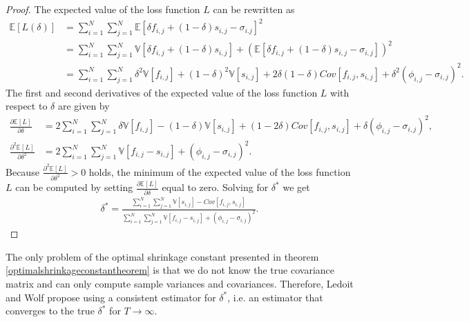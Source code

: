     	\begin{proof}
    	        The expected value of the loss function $L$ can be rewritten as
    	        \begin{align*}
    	            \mathbb{E}[L(\delta)] &= \sum_{i=1}^N \sum_{j=1}^N \mathbb{E}[\delta f_{i,j} + (1- \delta) s_{i,j} - \sigma_{i.j}]^2 \\
    	            &= \sum_{i=1}^N \sum_{j=1}^N \mathbb{V}[\delta f_{i,j} + (1 - \delta) s_{i,j}] + (\mathbb{E}[\delta f_{i,j} + (1- \delta) s_{i,j} - \sigma_{i,j}])^2 \\
    	            &= \sum_{i=1}^N \sum_{j=1}^N \delta^2 \mathbb{V}[f_{i,j}] + (1 - \delta)^2 \mathbb{V}[s_{i,j}] + 2 \delta (1 - \delta) Cov[f_{i,j}, s_{i,j}] + \delta^2 (\phi_{i,j} - \sigma_{i,j})^2.
    	        \end{align*}
    	        The first and second derivatives of the expected value of the loss function $L$ with respect to $\delta$ are given by
    	        \begin{align*}
    	            \frac{\partial \mathbb{E}[L]}{\partial \delta} &= 2 \sum_{i=1}^N \sum_{j=1}^N \delta \mathbb{V}[f_{i,j}] - (1 - \delta) \mathbb{V}[s_{i,j}] + (1- 2 \delta) Cov[f_{i,j}, s_{i,j}] + \delta (\phi_{i,j} - \sigma_{i,j})^2, \\
    	            \frac{\partial^2 \mathbb{E}[L]}{\partial \delta^2} &= 2 \sum_{i=1}^N \sum_{j=1}^N \mathbb{V}[f_{i,j} - s_{i,j}] + (\phi_{i,j} - \sigma_{i,j})^2.
    	        \end{align*}
    	        Because $ \frac{\partial^2 \mathbb{E}[L]}{\partial \delta^2} > 0$ holds, the minimum of the expected value of the loss function $L$ can be computed by setting $\frac{\partial \mathbb{E}[L]}{\partial \delta}$ equal to zero. Solving for $\delta^*$ we get
    	        \begin{align*}
    	            \delta^* = \frac{\sum_{i=1}^N \sum_{j=1}^N \mathbb{V}[s_{i,j}] - Cov[f_{i,j}, s_{i,j}]}{\sum_{i=1}^N \sum_{j=1}^N \mathbb{V}[f_{i,j} - s_{i,j}] + (\phi_{i,j} - \sigma_{i,j})^2}.
    	        \end{align*}
    	\end{proof}
    	
    	The only problem of the optimal shrinkage constant presented in theorem \ref{optimalshrinkageconstantheorem} is that we do not know the true covariance matrix and can only compute sample variances and covariances. Therefore, Ledoit and Wolf propose using a consistent estimator for $\delta^*$, i.e. an estimator that converges to the true $\delta^*$ for $T \rightarrow \infty$.
    	
